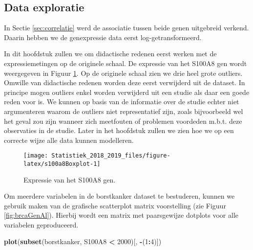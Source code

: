 \documentclass[12pt,dutch,coursenotes]{book}
\newenvironment{Shaded}{\begin{snugshade}}{\end{snugshade}}
\newcommand{\KeywordTok}[1]{\textcolor[rgb]{0.13,0.29,0.53}{\textbf{#1}}}
\newcommand{\DataTypeTok}[1]{\textcolor[rgb]{0.13,0.29,0.53}{#1}}
\newcommand{\DecValTok}[1]{\textcolor[rgb]{0.00,0.00,0.81}{#1}}
\newcommand{\StringTok}[1]{\textcolor[rgb]{0.31,0.60,0.02}{#1}}
\newcommand{\OperatorTok}[1]{\textcolor[rgb]{0.81,0.36,0.00}{\textbf{#1}}}
\newcommand{\NormalTok}[1]{#1}
\theoremstyle{definition}
\theoremstyle{definition}
\theoremstyle{definition}
\theoremstyle{remark}
\begin{document}
\subsection{Data exploratie}\label{data-exploratie}

In Sectie \ref{sec:correlatie} werd de associatie tussen beide genen
uitgebreid verkend. Daarin hebben we de genexpressie data eerst
log-getransformeerd.

In dit hoofdstuk zullen we om didactische redenen eerst werken met de
expressiemetingen op de originele schaal. De expressie van het S100A8
gen wordt weergegeven in Figuur \ref{fig:s100a8Boxplot}. Op de originele
schaal zien we drie heel grote outliers. Omwille van didactische redenen
worden deze eerst verwijderd uit de dataset. In principe mogen outliers
enkel worden verwijderd uit een studie als daar een goede reden voor is.
We kunnen op basis van de informatie over de studie echter niet
argumenteren waarom de outliers niet representatief zijn, zoals
bijvoorbeeld wel het geval zou zijn wanneer zich meetfouten of problemen
voordeden m.b.t. deze observaties in de studie. Later in het hoofdstuk
zullen we zien hoe we op een correcte wijze alle data kunnen modelleren.

\begin{Shaded}
\end{Shaded}

\begin{figure}

{\centering \texttt{[image: Statistiek\_2018\_2019\_files/figure-latex/s100a8Boxplot-1]} 

}

\caption{Expressie van het S100A8 gen.}\label{fig:s100a8Boxplot}
\end{figure}

Om meerdere variabelen in de borstkanker dataset te bestuderen, kunnen
we gebruik maken van de grafische scatterplot matrix voorstelling (zie
Figuur \ref{fig:brcaGenAl}). Hierbij wordt een matrix met paarsgewijze
dotplots voor alle variabelen geproduceerd.

\begin{Shaded}
\begin{Highlighting}[]
\KeywordTok{plot}\NormalTok{(}\KeywordTok{subset}\NormalTok{(borstkanker, S100A8 }\OperatorTok{<}\StringTok{ }\DecValTok{2000}\NormalTok{)[, }\OperatorTok{-}\NormalTok{(}\DecValTok{1}\OperatorTok{:}\DecValTok{4}\NormalTok{)])}
\end{Highlighting}
\end{Shaded}
\end{document}
